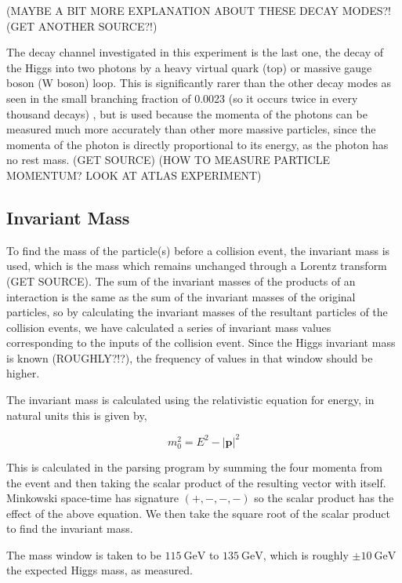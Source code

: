 \documentclass[11pt]{amsart}
\begin{document}
\begin{multicols}{2}
\cite{decaymodes1} \cite{decaymodes2}

(MAYBE A BIT MORE EXPLANATION ABOUT THESE DECAY MODES?! (GET ANOTHER SOURCE?!)

The decay channel investigated in this experiment is the last one, the decay of the Higgs into two photons by a heavy virtual quark (top) or massive gauge boson (W boson) loop. This is significantly rarer than the other decay modes as seen in the small branching fraction of 0.0023 (so it occurs twice in every thousand decays) \cite{HiggsCross1}, but is used because the momenta of the photons can be measured much more accurately than other more massive particles, since the momenta of the photon is directly proportional to its energy, as the photon has no rest mass. (GET SOURCE) (HOW TO MEASURE PARTICLE MOMENTUM? LOOK AT ATLAS EXPERIMENT)

\subsection{Invariant Mass}
\label{sec:invariant}

To find the mass of the particle(s) before a collision event, the invariant mass is used, which is the mass which remains unchanged through a Lorentz transform (GET SOURCE). The sum of the invariant masses of the products of an interaction is the same as the sum of the invariant masses of the original particles, so by calculating the invariant masses of the resultant particles of the collision events, we have calculated a series of invariant mass values corresponding to the inputs of the collision event. Since the Higgs invariant mass is known (ROUGHLY?!?), the frequency of values in that window should be higher.

The invariant mass is calculated using the relativistic equation for energy, in natural units this is given by,

\begin{equation}
  \label{eq:invariantmass}
  m_0^2 = E^2 - {|\mathbf{p}|}^2
\end{equation}

This is calculated in the parsing program by summing the four momenta from the event and then taking the scalar product of the resulting vector with itself. Minkowski space-time has signature $(+, -, -, -)$ so the scalar product has the effect of the above equation. We then take the square root of the scalar product to find the invariant mass. \cite{kinematics}

The mass window is taken to be $\SI{115}{\giga\electronvolt}$ to $\SI{135}{\giga\electronvolt}$, which is roughly $\pm \SI{10}{\giga\electronvolt}$ the expected Higgs mass, as measured. \cite{Higgs}


\end{multicols}
\end{document}
